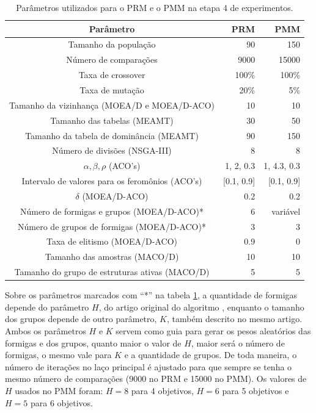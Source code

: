 \begin{table}[!htbp]
	\caption{Parâmetros utilizados para o PRM e o PMM na etapa 4 de experimentos.}
	\label{table_exp4_params}
	\begin{center}
		\begin{tabular}{c|r|r}
			\textbf{Parâmetro} & \textbf{PRM} &  \textbf{PMM} \\ %
			\hline
			Tamanho da população               &    90 &      150 \\ %
			Número de comparações        &   9000 &      15000 \\ %
			Taxa de crossover                & 100\% &    100\% \\ %
			Taxa de mutação                 &  20\% &      5\% \\ %
			Tamanho da vizinhança (MOEA/D e MOEA/D-ACO)    &    10 &       10 \\ %
			Tamanho das tabelas (MEAMT)   &    30 &       50 \\ %
			Tamanho da tabela de dominância (MEAMT) &    90 &      150 \\ %
			Número de divisões (NSGA-III)&     8 &        8 \\ %
			$\alpha, \beta, \rho$ (ACO's)& 1, 2, 0.3 & 1, 4.3, 0.3 \\ %
			Intervalo de valores para os feromônios (ACO's)& [0.1, 0.9] & [0.1, 0.9] \\ %
			$\delta$ (MOEA/D-ACO)& 0.2 & 0.2 \\ %
			Número de formigas e grupos (MOEA/D-ACO)*& 6 & variável \\ %
			Número de grupos de formigas (MOEA/D-ACO)*& 3 & 3 \\ %
			Taxa de elitismo (MOEA/D-ACO)& 0.9 & 0 \\ %
			Tamanho das amostras (MACO/D)& 10 & 10 \\  %
			Tamanho do grupo de estruturas ativas (MACO/D)& 5 & 5 \\
			\hline
		\end{tabular}
	\end{center}
\end{table}

Sobre os parâmetros marcados com ``*'' na tabela \ref{table_exp4_params}, a quantidade de formigas depende do parâmetro $H$, do artigo original do algoritmo \cite{ke2013}, enquanto o tamanho dos grupos depende de outro parâmetro, $K$, também descrito no mesmo artigo. Ambos os parâmetros $H$ e $K$ servem como guia para gerar os pesos aleatórios das formigas e dos grupos, quanto maior o valor de $H$, maior será o número de formigas, o mesmo vale para $K$ e a quantidade de grupos. De toda maneira, o número de iterações no laço principal é ajustado para que sempre se tenha o mesmo número de comparações (9000 no PRM e 15000 no PMM). Os valores de $H$ usados no PMM foram: $H=8$ para 4 objetivos, $H=6$ para 5 objetivos e $H=5$ para 6 objetivos.

